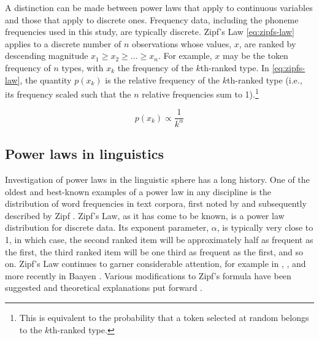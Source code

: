 A distinction can be made between power laws that apply to continuous variables and those that apply to discrete ones. Frequency data, including the phoneme frequencies used in this study, are typically discrete. Zipf's Law \eqref{eq:zipfs-law} applies to a discrete number of \(n\) observations whose values, \(x\), are ranked by descending magnitude \(x_1 \geq x_2 \geq \ldots \geq x_n\). For example, \(x\) may be the token frequency of \(n\) types, with \(x_k\) the frequency of the \(k\)th-ranked type. In \eqref{eq:zipfs-law}, the quantity \(p(x_k)\) is the relative frequency of the \(k\)th-ranked type (i.e., its frequency scaled such that the \(n\) relative frequencies sum to 1).\footnote{This is equivalent to the probability that a token selected at random belongs to the \(k\)th-ranked type.}

\begin{equation}
p(x_k) \propto \frac{1}{k^{\alpha}}
\label{eq:zipfs-law}
\end{equation}

\hypertarget{power-laws-linguistics}{%
\subsection{Power laws in linguistics}\label{power-laws-linguistics}}

Investigation of power laws in the linguistic sphere has a long history. One of the oldest and best-known examples of a power law in any discipline is the distribution of word frequencies in text corpora, first noted by \textcite{estoup_gammes_1916} and subsequently described by Zipf \autocites*{zipf_selective_1932}{zipf_human_1949}. Zipf's Law, as it has come to be known, is a power law distribution for discrete data. Its exponent parameter, \(\alpha\), is typically very close to 1, in which case, the second ranked item will be approximately half as frequent as the first, the third ranked item will be one third as frequent as the first, and so on. Zipf's Law continues to garner considerable attention, for example in \textcite{kucera_computational_1967}, \textcite{montemurro_beyond_2001}, and more recently in Baayen \autocites*{baayen_word_2001}{baayen_analyzing_2008}. Various modifications to Zipf's formula have been suggested \autocite[notably][]{mandelbrot_structure_1954} and theoretical explanations put forward \autocites{li_random_1992}{naranan_information_1992}{naranan_models_1998}.

